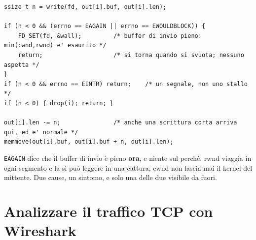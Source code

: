 
\begin{lstlisting}[language={[POSIX]C}, style=wnumbers, title={EAGAIN, e ciò che non dice}]
ssize_t n = write(fd, out[i].buf, out[i].len);

if (n < 0 && (errno == EAGAIN || errno == EWOULDBLOCK)) {
    FD_SET(fd, &wall);         /* buffer di invio pieno: min(cwnd,rwnd) e' esaurito */
    return;                    /* si torna quando si svuota; nessuno aspetta */
}
if (n < 0 && errno == EINTR) return;    /* un segnale, non uno stallo */
if (n < 0) { drop(i); return; }

out[i].len -= n;               /* anche una scrittura corta arriva qui, ed e' normale */
memmove(out[i].buf, out[i].buf + n, out[i].len);
\end{lstlisting}

\texttt{EAGAIN} dice che il buffer di invio è pieno \textbf{ora}, e niente sul perché. rwnd viaggia in ogni segmento e la
si può leggere in una cattura; cwnd non lascia mai il kernel del mittente. Due cause, un sintomo, e solo una delle due
visibile da fuori.

\section{Analizzare il traffico TCP con Wireshark}

